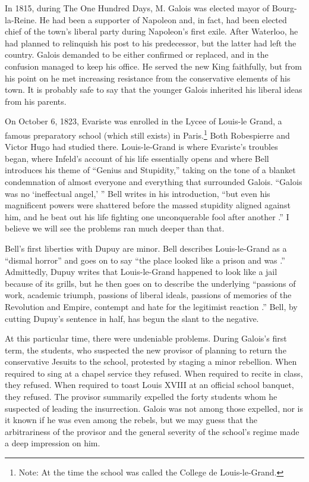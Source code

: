 \documentclass[12pt]{article}
\begin{document}
In 1815, during The One Hundred Days, M. Galois was elected mayor of Bourg-la-Reine. He had been a supporter of Napoleon and, in fact, had been elected chief of the town's liberal party during Napoleon's first exile. After Waterloo, he had planned to relinquish his post to his predecessor, but the latter had left the country. Galois demanded to be either confirmed or replaced, and in the confusion managed to keep his office. He served the new King faithfully, but from his point on he met increasing resistance from the conservative elements of his town. It is probably safe to say that the younger Galois inherited his liberal ideas from his parents.

On October 6, 1823, Evariste was enrolled in the Lycee of Louis-le Grand, a famous preparatory school (which still exists) in Paris.\footnote{Note: At the time the school was called the College de Louis-le-Grand.} Both Robespierre and Victor Hugo had studied there. Louis-le-Grand is where Evariste's troubles began, where Infeld's account of his life essentially opens and where Bell introduces his theme of ``Genius and Stupidity,'' taking on the tone of a blanket condemnation of almost everyone and everything that surrounded Galois. ``Galois was no `ineffectual angel,' '' Bell writes in his introduction, ``but even his magnificent powers were shattered before the massed stupidity aligned against him, and he beat out his life fighting one unconquerable fool after another \cite{14}.'' I believe we will see the problems ran much deeper than that.

Bell's first liberties with Dupuy are minor. Bell describes Louis-le-Grand as a ``dismal horror'' and goes on to say ``the place looked like a prison and was \cite{15}.'' Admittedly, Dupuy writes that Louis-le-Grand happened to look like a jail because of its grills, but he then goes on to describe the underlying ``passions of work, academic triumph, passions of liberal ideals, passions of memories of the Revolution and Empire, contempt and hate for the legitimist reaction \cite{16}.'' Bell, by cutting Dupuy's sentence in half, has begun the slant to the negative.

At this particular time, there were undeniable problems. During Galois's first term, the students, who suspected the new provisor of planning to return the conservative Jesuits to the school, protested by staging a minor rebellion. When required to sing at a chapel service they refused. When required to recite in class, they refused. When required to toast Louis XVIII at an official school banquet, they refused. The provisor summarily expelled the forty students whom he suspected of leading the insurrection. Galois was not among those expelled, nor is it known if he was even among the rebels, but we may guess that the arbitrariness of the provisor and the general severity of the school's regime made a deep impression on him.
\end{document}
